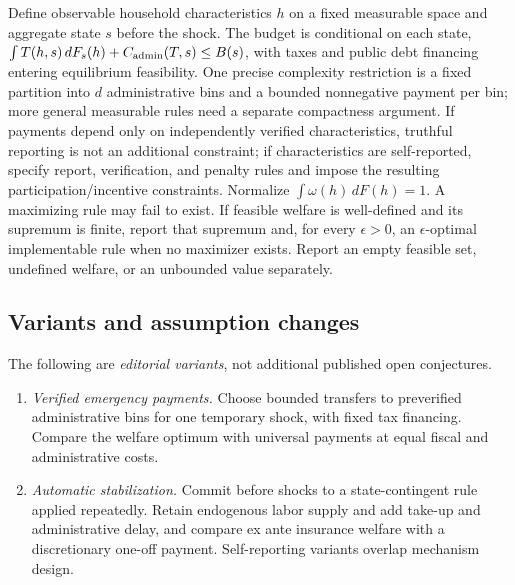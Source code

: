 \documentclass[11pt,a4paper]{article}
\begin{document}
Define observable household characteristics \(h\) on a fixed measurable space and aggregate state \(s\) before the shock. The budget is conditional on each state, \(\int T(h,s)\,dF_s(h)+C_{\rm admin}(T,s)\le B(s)\), with taxes and public debt financing entering equilibrium feasibility. One precise complexity restriction is a fixed partition into \(d\) administrative bins and a bounded nonnegative payment per bin; more general measurable rules need a separate compactness argument. If payments depend only on independently verified characteristics, truthful reporting is not an additional constraint; if characteristics are self-reported, specify report, verification, and penalty rules and impose the resulting participation/incentive constraints. Normalize \(\int\omega(h)\,dF(h)=1\). A maximizing rule may fail to exist. If feasible welfare is well-defined and its supremum is finite, report that supremum and, for every \(\epsilon>0\), an \(\epsilon\)-optimal implementable rule when no maximizer exists. Report an empty feasible set, undefined welfare, or an unbounded value separately.
\subsection*{Variants and assumption changes}
The following are \emph{editorial variants}, not additional published open conjectures.
\begin{enumerate}
\item \emph{Verified emergency payments.} Choose bounded transfers to preverified administrative bins for one temporary shock, with fixed tax financing. Compare the welfare optimum with universal payments at equal fiscal and administrative costs.
\item \emph{Automatic stabilization.} Commit before shocks to a state-contingent rule applied repeatedly. Retain endogenous labor supply and add take-up and administrative delay, and compare ex ante insurance welfare with a discretionary one-off payment. Self-reporting variants overlap mechanism design.
\end{enumerate}
\end{document}
